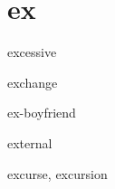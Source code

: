 \chapter{ex}

\begin{word}{excessive}
\end{word}

\begin{word}{exchange}
\end{word}

\begin{word}{ex-boyfriend}
\end{word}

\begin{word}{external}
\end{word}

\begin{word}{excurse, excursion}
\end{word}